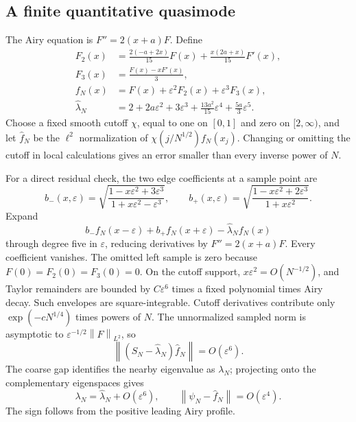 \documentclass[11pt,letterpaper]{article}
\numberwithin{equation}{section}
\theoremstyle{remark}
\newcommand{\norm}[1]{\left\lVert#1\right\rVert}
\newcommand{\eps}{\varepsilon}
\begin{document}
\subsection{A finite quantitative quasimode}
The Airy equation is $F''=2(x+a)F$. Define
\begin{equation}\label{air:cb:eq:app-quasimode}
\begin{aligned}
F_2(x)&=\frac{2(-a+2x)}{15}F(x)+\frac{x(2a+x)}{15}F'(x),\\
F_3(x)&=\frac{F(x)-xF'(x)}3,\\
f_N(x)&=F(x)+\eps^2F_2(x)+\eps^3F_3(x),\\
\widehat\lambda_N&=2+2a\eps^2+3\eps^3
+\frac{13a^2}{15}\eps^4+\frac{5a}{3}\eps^5.
\end{aligned}
\end{equation}
Choose a fixed smooth cutoff $\chi$, equal to one on $[0,1]$ and zero on
$[2,\infty)$, and let $\widehat f_N$ be the $\ell^2$ normalization of
$\chi(j/N^{1/2})f_N(x_j)$. Changing or omitting the cutoff in local
calculations gives an error smaller than every inverse power of $N$.

For a direct residual check, the two edge coefficients at a sample point are
\[
b_-(x,\eps)=\sqrt{\frac{1-x\eps^2+3\eps^3}{1+x\eps^2-\eps^3}},\qquad
b_+(x,\eps)=\sqrt{\frac{1-x\eps^2+2\eps^3}{1+x\eps^2}}.
\]
Expand
\[
b_-f_N(x-\eps)+b_+f_N(x+\eps)-\widehat\lambda_Nf_N(x)
\]
through degree five in $\eps$, reducing derivatives by $F''=2(x+a)F$.
Every coefficient vanishes. The omitted left sample is zero because
$F(0)=F_2(0)=F_3(0)=0$. On the cutoff support,
$x\eps^2=O(N^{-1/2})$, and Taylor remainders are bounded by
$C\eps^6$ times a fixed polynomial times Airy decay. Such envelopes are
square-integrable. Cutoff derivatives contribute only
$\exp(-cN^{1/4})$ times powers of $N$. The unnormalized sampled norm is
asymptotic to $\eps^{-1/2}\norm F_{L^2}$, so
\begin{equation}\label{air:cb:eq:app-residual}
\norm{(S_N-\widehat\lambda_N)\widehat f_N}=O(\eps^6).
\end{equation}
The coarse gap identifies the nearby eigenvalue as $\lambda_N$; projecting
onto the complementary eigenspaces gives
\begin{equation}\label{air:cb:eq:app-approx}
\lambda_N=\widehat\lambda_N+O(\eps^6),\qquad
\norm{\psi_N-\widehat f_N}=O(\eps^4).
\end{equation}
The sign follows from the positive leading Airy profile.
\end{document}
